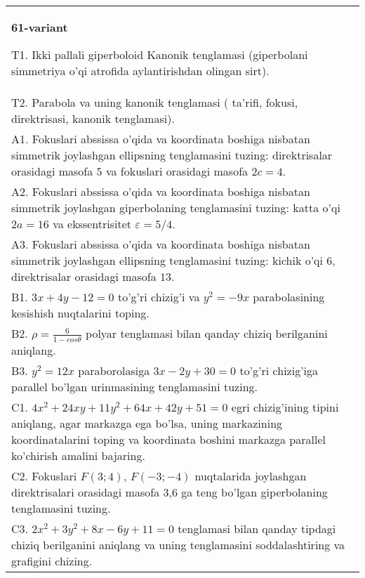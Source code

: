 \documentclass{article}
\begin{document}
\begin{tabular}{m{17cm}}
\textbf{61-variant}
\newline

T1. Ikki pallali giperboloid Kanonik tenglamasi (giperbolani simmetriya o'qi atrofida aylantirishdan olingan sirt).\\

T2. Parabola va uning kanonik tenglamasi ( ta'rifi, fokusi, direktrisasi, kanonik tenglamasi).\\

A1. Fokuslari abssissa o'qida va koordinata boshiga nisbatan simmetrik joylashgan ellipsning tenglamasini tuzing: direktrisalar orasidagi masofa $5$ va fokuslari orasidagi masofa $2c=4$.\\

A2. Fokuslari abssissa o'qida va koordinata boshiga nisbatan simmetrik joylashgan giperbolaning tenglamasini tuzing: katta o'qi $2a=16$ va ekssentrisitet $\varepsilon=5/4$.\\

A3. Fokuslari abssissa o'qida va koordinata boshiga nisbatan simmetrik joylashgan ellipsning tenglamasini tuzing: kichik o'qi $6$, direktrisalar orasidagi masofa $13$.\\

B1. $3x + 4y - 12 = 0$ to'g'ri chizig'i va $y^{2} = - 9x$ parabolasining kesishish nuqtalarini toping.\\

B2. $\rho = \frac{6}{1 - cos\theta}$ polyar tenglamasi bilan qanday chiziq berilganini aniqlang.  \\

B3. $y^{2} = 12x$ paraborolasiga $3x - 2y + 30 = 0$ to'g'ri chizig'iga parallel bo'lgan urinmasining tenglamasini tuzing.  \\

C1. $4x^{2} + 24xy + 11y^{2} + 64x + 42y + 51 = 0$ egri chizig'ining tipini aniqlang, agar markazga ega bo'lsa, uning markazining koordinatalarini toping va koordinata boshini markazga parallel ko'chirish amalini bajaring.\\

C2. Fokuslari $F(3;4)$, $F(-3;-4)$ nuqtalarida joylashgan direktrisalari orasidagi masofa 3,6 ga teng bo'lgan giperbolaning tenglamasini tuzing.  \\

C3. $2x^{2} + 3y^{2} + 8x - 6y + 11 = 0$ tenglamasi bilan qanday tipdagi chiziq berilganini aniqlang va uning tenglamasini soddalashtiring va grafigini chizing.  \\

\end{tabular}
\vspace{1cm}
\end{document}
